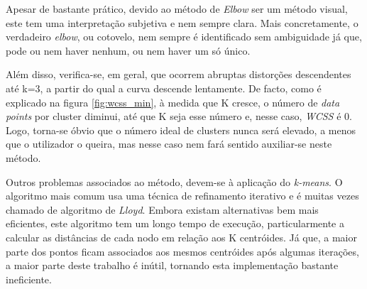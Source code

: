 \documentclass[12pt, a4paper, oneside]{scrreport}
\begin{document}
\quad Apesar de bastante prático, devido ao método de \textit{Elbow} ser um método visual, este tem uma interpretação subjetiva e nem sempre clara.
Mais concretamente, o verdadeiro \textit{elbow}, ou cotovelo, nem sempre é identificado sem ambiguidade já que, pode ou nem haver nenhum, ou nem haver um só único. 
\par Além disso, verifica-se, em geral, que ocorrem abruptas distorções descendentes até k=3, a partir do qual a curva descende lentamente. De facto, como é explicado na figura \ref{fig:wcss_min}, à medida que K cresce, o número de \textit{data points} por cluster diminui, até que K seja esse número e, nesse caso, \textit{WCSS} é 0. Logo, torna-se óbvio que o número ideal de clusters nunca será elevado, a menos que o utilizador o queira, mas nesse caso nem fará sentido auxiliar-se neste método.
\par Outros problemas associados ao método, devem-se à aplicação do \textit{k-means}. O algoritmo mais comum usa uma técnica de refinamento iterativo e é muitas vezes chamado de  algoritmo de \textit{Lloyd}. Embora existam alternativas bem mais eficientes, este algoritmo tem um longo tempo de execução, particularmente a calcular as distâncias de cada nodo em relação aos K centróides. Já que, a maior parte dos pontos ficam associados aos mesmos centróides após algumas iterações, a maior parte deste trabalho é inútil, tornando esta implementação bastante ineficiente.
\end{document}
